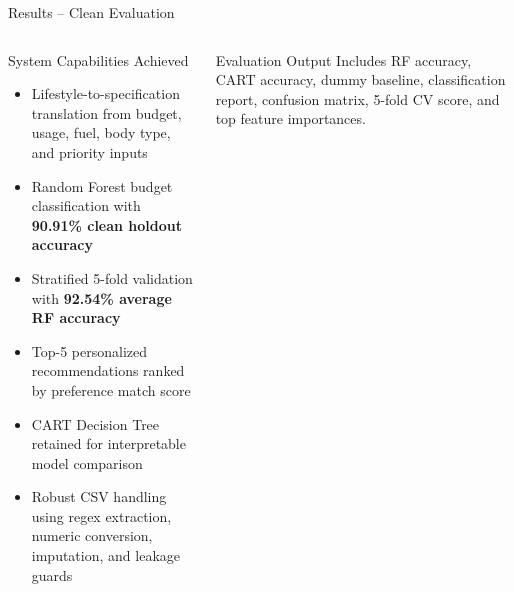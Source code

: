 \documentclass[aspectratio=169]{beamer}
\begin{document}
\begin{frame}{Results -- Clean Evaluation}
\begin{columns}[t]
      \begin{block}{System Capabilities Achieved}
        \begin{itemize}
          \setlength\itemsep{0.35em}
          \item Lifestyle-to-specification translation from budget, usage, fuel, body type, and priority inputs
          \item Random Forest budget classification with \textbf{90.91\% clean holdout accuracy}
          \item Stratified 5-fold validation with \textbf{92.54\% average RF accuracy}
          \item Top-5 personalized recommendations ranked by preference match score
          \item CART Decision Tree retained for interpretable model comparison
          \item Robust CSV handling using regex extraction, numeric conversion, imputation, and leakage guards
        \end{itemize}
      \end{block}
      \vspace{0.4em}
      \begin{block}{Evaluation Output Includes}
        RF accuracy, CART accuracy, dummy baseline, classification report,
        confusion matrix, 5-fold CV score, and top feature importances.
      \end{block}
  \end{columns}
\end{frame}
\end{document}
